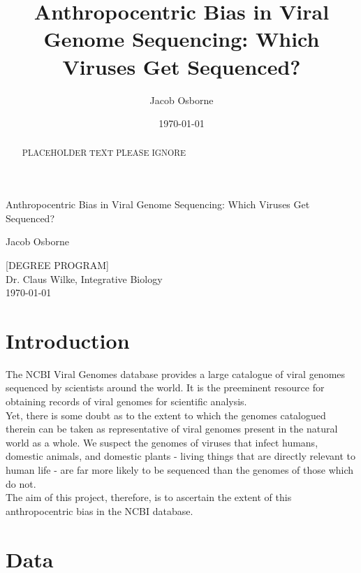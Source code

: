 \documentclass[12pt]{article}
\title{Anthropocentric Bias in Viral Genome Sequencing: Which Viruses Get Sequenced?}
\date{\today}
\author{Jacob Osborne}
\begin{document}
    \begin{titlepage}
        \begin{center}
            \vspace*{1in}
            \LARGE
            Anthropocentric Bias in Viral Genome Sequencing: Which Viruses Get Sequenced?

            \vspace*{1in}
            \large
            Jacob Osborne

            \vfill
            [DEGREE PROGRAM] \\
            Dr. Claus Wilke, Integrative Biology \\
            \today
        \end{center}
    \end{titlepage}
    
    \begin{abstract}
        PLACEHOLDER TEXT PLEASE IGNORE
    \end{abstract}

    \section{Introduction}

    The NCBI Viral Genomes database provides a large catalogue of viral genomes 
    sequenced by scientists around the world. It is the preeminent resource for
    obtaining records of viral genomes for scientific analysis. \\
    Yet, there is some doubt as to the extent to which the genomes catalogued
    therein can be taken as representative of viral genomes present in the
    natural world as a whole. We suspect the genomes of viruses that infect
    humans, domestic animals, and domestic plants - living things that are
    directly relevant to human life - are far more likely to be sequenced than
    the genomes of those which do not. \\
    The aim of this project, therefore, is to ascertain the extent of this
    anthropocentric bias in the NCBI database.

    \section{Data}
\end{document}
